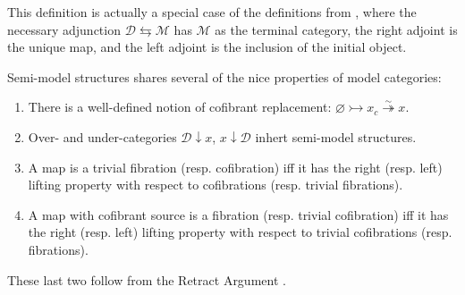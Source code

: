\documentclass[a4paper,10pt
]{article}%
\renewcommand{\1}{\eta}%
\begin{document}
\begin{remark}
      This definition is actually a special case of the definitions from \cite{Spi01,Wh16},
      where the necessary adjunction $\mathcal D \leftrightarrows \mathcal M$
      has $\mathcal M$ as the terminal category, the right adjoint is the unique map, and the left adjoint is the inclusion of the initial object.
	
\end{remark}

Semi-model structures shares several of the nice properties of model categories:
\begin{enumerate}[label=(\roman*)]
\item There is a well-defined notion of cofibrant replacement: $\varnothing \rightarrowtail x_c \overset{\sim}{\twoheadrightarrow} x$.
\item Over- and under-categories $\mathcal D \downarrow x$, $x \downarrow \mathcal D$ inhert semi-model structures.
\item A map is a trivial fibration (resp. cofibration) iff it has the right (resp. left) lifting property with respect to cofibrations (resp. trivial fibrations).
\item A map with cofibrant source is a fibration (resp. trivial cofibration) iff it has the right (resp. left) lifting property with respect to trivial cofibrations (resp. fibrations).
\end{enumerate}
These last two follow from the Retract Argument \cite[Lemma 1.1.9]{Hov99}.
\end{document}
